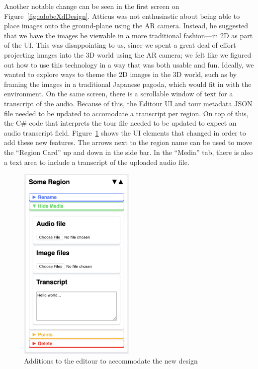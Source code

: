 \documentclass[a4paper, 10pt, american, titlepage]{article}
\begin{document}
Another notable change can be seen in the first screen on
Figure~\ref{fig:adobeXdDesign}. Atticus was not enthusiastic about being able
to place images onto the ground-plane using the AR camera. Instead, he
suggested that we have the images be viewable in a more traditional
fashion---in 2D as part of the UI. This was disappointing to us, since we spent
a great deal of effort projecting images into the 3D world using the AR camera;
we felt like we figured out how to use this technology in a way that was both
usable and fun. Ideally, we wanted to explore ways to theme the 2D images in
the 3D world, such as by framing the images in a traditional Japanese pagoda,
which would fit in with the environment. On the same screen, there is a
scrollable window of text for a transcript of the audio. Because of this, the
Editour UI and tour metadata JSON file needed to be updated to accomodate a
transcript per region. On top of this, the C\# code that interprets the tour
file needed to be updated to expect an audio transcript field.
Figure~\ref{fig:editourAdditions} shows the UI elements that changed in order
to add these new features. The arrows next to the region name can be used to
move the ``Region Card'' up and down in the side bar. In the ``Media'' tab, there
is also a text area to include a transcript of the uploaded audio file. 

\begin{figure}[h]
	\centering
	\includegraphics[width=0.5\textwidth]{editour-additions.png}
	\caption[Additions to the editour to accommodate the new design]
    {Additions to the editour to accommodate the new design}
	\label{fig:editourAdditions}
\end{figure}
\end{document}
